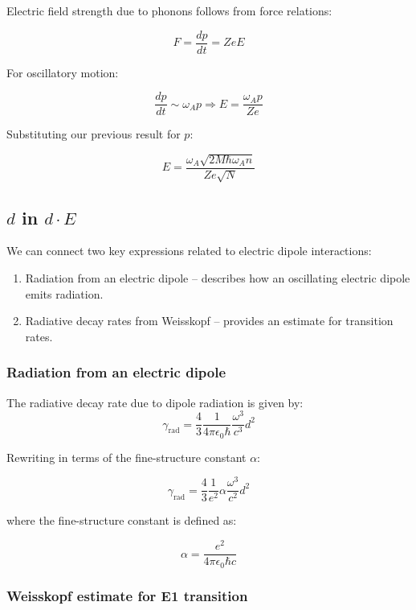 \documentclass[
]{article}
\renewcommand{\[}{\begin{equation}}
\renewcommand{\]}{\end{equation}}
\providecommand{\tightlist}{%
  \setlength{\itemsep}{0pt}\setlength{\parskip}{0pt}}
\begin{document}
Electric field strength due to phonons follows from force relations:

\[
F = \frac{dp}{dt} = ZeE
\]

For oscillatory motion:

\[
\frac{dp}{dt} \sim \omega_A p \Rightarrow E = \frac{\omega_A p}{Ze}
\]

Substituting our previous result for \(p\):

\[
E = \frac{\omega_A \sqrt{2M \hbar \omega_A n}}{Ze \sqrt{N}} \label{eq:E}
\]

\subsection{\texorpdfstring{\(d\) in
\(d \cdot E\)}{d in d \textbackslash cdot E}}\label{d-in-d-cdot-e}

We can connect two key expressions related to electric dipole
interactions:

\begin{enumerate}
\def\labelenumi{\arabic{enumi}.}
\tightlist
\item
  Radiation from an electric dipole -- describes how an oscillating
  electric dipole emits radiation.\\
\item
  Radiative decay rates from Weisskopf -- provides an estimate for
  transition rates.
\end{enumerate}

\subsubsection{Radiation from an electric
dipole}\label{radiation-from-an-electric-dipole}

The radiative decay rate due to dipole radiation is given by: \[
\gamma_{\text{rad}} = \frac{4}{3} \frac{1}{4 \pi \epsilon_0 \hbar} \frac{\omega^3}{c^3} d^2
\]

Rewriting in terms of the fine-structure constant \(\alpha\):

\[
\gamma_{\text{rad}} = \frac{4}{3} \frac{1}{e^2} \alpha \frac{\omega^3}{c^2} d^2
\]

where the fine-structure constant is defined as:

\[
\alpha = \frac{e^2}{4\pi \epsilon_0 \hbar c}
\]

\subsubsection{Weisskopf estimate for E1
transition}\label{weisskopf-estimate-for-e1-transition}
\end{document}
